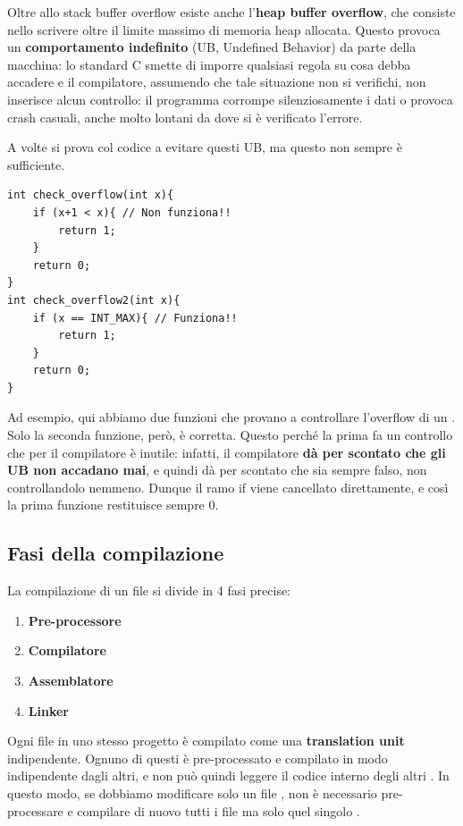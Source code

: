 \documentclass[11pt, a4paper, titlepage, oneside]{scrbook}
\begin{document}
\begin{Definizione}
\label{def-heap-buffer-overflow}
Oltre allo stack buffer overflow esiste anche l'\textbf{heap buffer overflow}, che consiste nello scrivere oltre il limite massimo di memoria heap allocata. Questo provoca un \textbf{comportamento indefinito} (UB, Undefined Behavior) da parte della macchina: lo standard C smette di imporre qualsiasi regola su cosa debba accadere e il compilatore, assumendo che tale situazione non si verifichi, non inserisce alcun controllo: il programma corrompe silenziosamente i dati o provoca crash casuali, anche molto lontani da dove si è verificato l'errore.
\end{Definizione}

A volte si prova col codice a evitare questi UB, ma questo non sempre è sufficiente.

\begin{lstlisting}[style=C]
int check_overflow(int x){
    if (x+1 < x){ // Non funziona!!
        return 1;
    }
    return 0;
}
int check_overflow2(int x){
    if (x == INT_MAX){ // Funziona!!
        return 1;
    }
    return 0;
}
\end{lstlisting}

Ad esempio, qui abbiamo due funzioni che provano a controllare l'overflow di un . Solo la seconda funzione, però, è corretta. Questo perché la prima fa un controllo che per il compilatore è inutile: infatti, il compilatore \textbf{dà per scontato che gli UB non accadano mai}, e quindi dà per scontato che  sia sempre falso, non controllandolo nemmeno. Dunque il ramo if viene cancellato direttamente, e così la prima funzione restituisce sempre 0.

\subsection{Fasi della compilazione}

La compilazione di un file  si divide in 4 fasi precise:
\begin{enumerate}[label=\arabic*°]
    \item \textbf{Pre-processore}
    \item \textbf{Compilatore}
    \item \textbf{Assemblatore}
    \item \textbf{Linker}
\end{enumerate}

Ogni file  in uno stesso progetto è compilato come una \textbf{translation unit} indipendente. Ognuno di questi è pre-processato e compilato in modo indipendente dagli altri, e non può quindi leggere il codice interno degli altri . In questo modo, se dobbiamo modificare solo un file , non è necessario pre-processare e compilare di nuovo tutti i file ma solo quel singolo .
\end{document}
